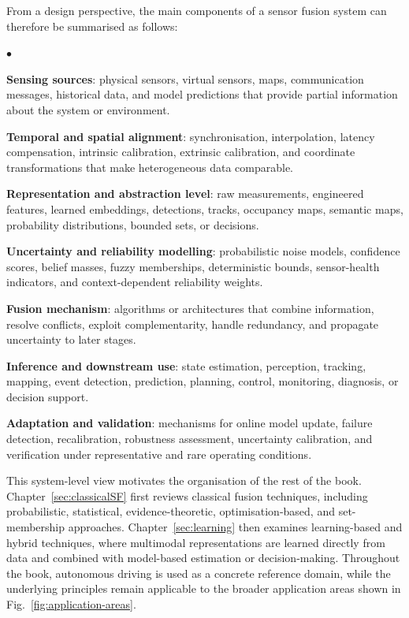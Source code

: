 \documentclass[11pt,oneside,openany]{book}
\newenvironment{list4a}{
  \begin{list}{$\bullet$}{%
      \setlength{\itemsep}{0.05cm}
      \setlength{\labelsep}{0.2cm}
      \setlength{\labelwidth}{0.3cm}
      \setlength{\parsep}{0in}
      \setlength{\parskip}{0in}
      \setlength{\topsep}{0in}
      \setlength{\partopsep}{0in}
      \setlength{\leftmargin}{0.16in}}}
      {\end{list}}
\begin{document}
From a design perspective, the main components of a sensor fusion system can therefore be summarised as follows:
\begin{list4a}
    \item \textbf{Sensing sources}: physical sensors, virtual sensors, maps, communication messages, historical data, and model predictions that provide partial information about the system or environment.
    \item \textbf{Temporal and spatial alignment}: synchronisation, interpolation, latency compensation, intrinsic calibration, extrinsic calibration, and coordinate transformations that make heterogeneous data comparable.
    \item \textbf{Representation and abstraction level}: raw measurements, engineered features, learned embeddings, detections, tracks, occupancy maps, semantic maps, probability distributions, bounded sets, or decisions.
    \item \textbf{Uncertainty and reliability modelling}: probabilistic noise models, confidence scores, belief masses, fuzzy memberships, deterministic bounds, sensor-health indicators, and context-dependent reliability weights.
    \item \textbf{Fusion mechanism}: algorithms or architectures that combine information, resolve conflicts, exploit complementarity, handle redundancy, and propagate uncertainty to later stages.
    \item \textbf{Inference and downstream use}: state estimation, perception, tracking, mapping, event detection, prediction, planning, control, monitoring, diagnosis, or decision support.
    \item \textbf{Adaptation and validation}: mechanisms for online model update, failure detection, recalibration, robustness assessment, uncertainty calibration, and verification under representative and rare operating conditions.
\end{list4a}

This system-level view motivates the organisation of the rest of the book. Chapter~\ref{sec:classicalSF} first reviews classical fusion techniques, including probabilistic, statistical, evidence-theoretic, optimisation-based, and set-membership approaches. Chapter~\ref{sec:learning} then examines learning-based and hybrid techniques, where multimodal representations are learned directly from data and combined with model-based estimation or decision-making. Throughout the book, autonomous driving is used as a concrete reference domain, while the underlying principles remain applicable to the broader application areas shown in Fig.~\ref{fig:application-areas}.
\end{document}
